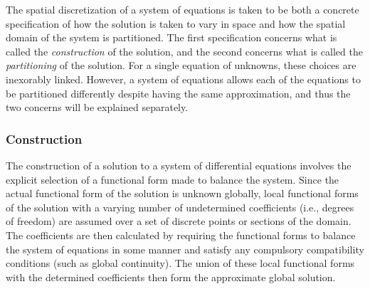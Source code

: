 The spatial discretization of a system of equations is taken to be both a concrete specification of how the solution is taken to vary in space and how the spatial domain of the system is partitioned.
The first specification concerns what is called the \emph{construction} of the solution, and the second concerns what is called the \emph{partitioning} of the solution.
For a single equation of unknowns, these choices are inexorably linked.
However, a system of equations allows each of the equations to be partitioned differently despite having the same approximation, and thus the two concerns will be explained separately.


\subsubsection{Construction}

The construction of a solution to a system of differential equations involves the explicit selection of a functional form made to balance the system.
Since the actual functional form of the solution is unknown globally, local functional forms of the solution with a varying number of undetermined coefficients (i.e., degrees of freedom) are assumed over a set of discrete points or sections of the domain.
The coefficients are then calculated by requiring the functional forms to balance the system of equations in some manner and satisfy any compulsory compatibility conditions (such as global continuity).
The union of these local functional forms with the determined coefficients then form the approximate global solution.

